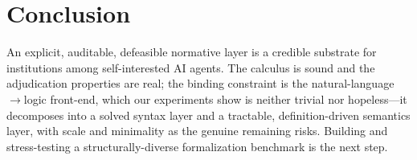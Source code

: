 \section{Conclusion}
An explicit, auditable, defeasible normative layer is a credible substrate for institutions
among self-interested AI agents. The calculus is sound and the adjudication properties are
real; the binding constraint is the natural-language$\rightarrow$logic front-end, which our
experiments show is neither trivial nor hopeless---it decomposes into a solved syntax layer and
a tractable, definition-driven semantics layer, with scale and minimality as the genuine
remaining risks. Building and stress-testing a structurally-diverse formalization benchmark is
the next step.
